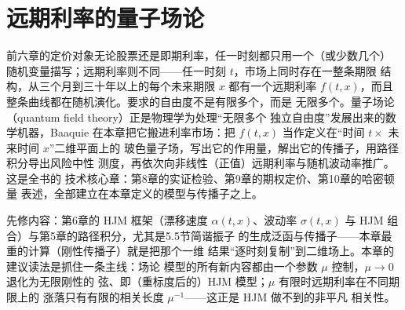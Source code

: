 \chapter{远期利率的量子场论}

前六章的定价对象无论股票还是即期利率，任一时刻都只用一个（或少数几个）
随机变量描写；远期利率则不同——任一时刻 $t$，市场上同时存在一整条期限
结构，从三个月到三十年以上的每个未来期限 $x$ 都有一个远期利率
$f(t,x)$，而且整条曲线都在随机演化。要求的自由度不是有限多个，而是
无限多个。量子场论（quantum field theory）正是物理学为处理“无限多个
独立自由度”发展出来的数学机器，Baaquie 在本章把它搬进利率市场：把
$f(t,x)$ 当作定义在“时间 $t\times$ 未来时间 $x$”二维平面上的
玻色量子场，写出它的作用量，解出它的传播子，用路径积分导出风险中性
测度，再依次向非线性（正值）远期利率与随机波动率推广。这是全书的
技术核心章：第8章的实证检验、第9章的期权定价、第10章的哈密顿量
表述，全部建立在本章定义的模型与传播子之上。

先修内容：第6章的 HJM 框架（漂移速度 $\alpha(t,x)$、波动率
$\sigma(t,x)$ 与 HJM 组合）与第5章的路径积分，尤其是5.5节简谐振子
的生成泛函与传播子——本章最重的计算（刚性传播子）就是把那个一维
结果“逐时刻复制”到二维场上。本章的建议读法是抓住一条主线：场论
模型的所有新内容都由一个参数 $\mu$ 控制，$\mu\to0$ 退化为无限刚性的
弦、即（重标度后的）HJM 模型；$\mu$ 有限时远期利率在不同期限上的
涨落只有有限的相关长度 $\mu^{-1}$——这正是 HJM 做不到的非平凡
相关性。

